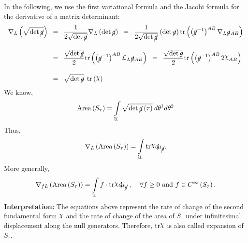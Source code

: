 \documentclass[12pt, a4paper]{report}
\theoremstyle{bfnote}
\newcommand{\chits}{\raisebox{0.5ex}{$\chi$}} %
\begin{document}
In the following, we use the first variational formula and the Jacobi formula
for the derivative of a matrix determinant:
\begin{equation*}
    \begin{aligned}
        \nabla_L\left(\sqrt{\det{\cancel{g}}}\right) \hspace{0.5em} &= \hspace{0.5em} \frac{1}{2\sqrt{\det\cancel{g}}}\nabla_L\left(\det{\cancel{g}}\right) \hspace{0.5em}= \hspace{0.5em} \frac{1}{2\sqrt{\det\cancel{g}}}\left(\det\cancel{g}\right)\mathrm{tr}\left(\left(\cancel{g}^{-1}\right)^{AB}\nabla_L\cancel{g}_{AB}\right)\\[1em]
                                                                    &= \hspace{0.5em} \frac{\sqrt{\det\cancel{g}}}{2}\mathrm{tr}\left(\left(\cancel{g}^{-1}\right)^{AB}\mathcal{L}_L\cancel{g}_{AB}\right) \hspace{0.5em} = \hspace{0.5em} \frac{\sqrt{\det\cancel{g}}}{2}\mathrm{tr}\left(\left(\cancel{g}^{-1}\right)^{AB}2\chits_{AB}\right)\\[1em]
                                                                    &= \hspace{0.5em} \sqrt{\det\cancel{g}}\hspace{0.4em}\mathrm{tr}\left(\chits\right)
    \end{aligned}
\end{equation*}
We know, 
\begin{equation*}
    \mathrm{Area}\left(S_\tau\right) = \int\limits_{\mathcal{U}} \sqrt{\det\cancel{g}\left(\tau\right)} \: d\theta^1 d\theta^2
\end{equation*}
Thus, 
\begin{equation*}
    \nabla_L\left(\mathrm{Area}\left(S_\tau\right)\right) = \int\limits_{\mathcal{U}}\mathrm{tr}\mathrm{\chits}d\hspace{-0.2em}\mu_{\cancel{g}}.
\end{equation*}
More generally,
\begin{equation}{\label{eq:AreachangealongL}}
    \nabla_{fL}\left(\mathrm{Area}\left(S_\tau\right)\right) = \int\limits_{\mathcal{U}}f\cdot\mathrm{tr}\mathrm{\chits}d\hspace{-0.2em}\mu_{\cancel{g}}\;, \quad \forall f \geq 0 \text{ and } f \in C^\infty\left(S_\tau\right).
\end{equation}
{\bfseries{Interpretation:}} The equations above represent the rate of change of
the second fundamental form $\chits$  and the rate of change of the area of
$S_\tau$ under infinitesimal displacement along the null generators. Therefore,
$\mathrm{tr}\chits$ is also called expansion of $S_\tau$.
\end{document}
